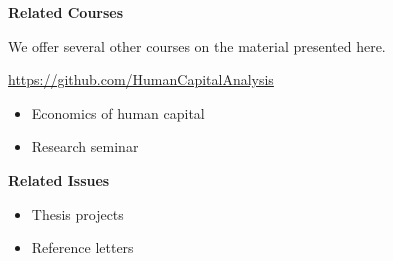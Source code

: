 \begin{frame}
	\textbf{Related Courses}\vspace{0.3cm}

We offer several other courses on the material presented here.

	\begin{center}
	\url{https://github.com/HumanCapitalAnalysis}
	\end{center}


	\begin{itemize}\setlength\itemsep{1em}
	\item Economics of human capital
	\item Research seminar
	\end{itemize}

\end{frame}
\begin{frame}
	\textbf{Related Issues}\vspace{0.3cm}

	\begin{itemize}\setlength\itemsep{1em}
	\item Thesis projects
	\item Reference letters
	\end{itemize}
\end{frame}
